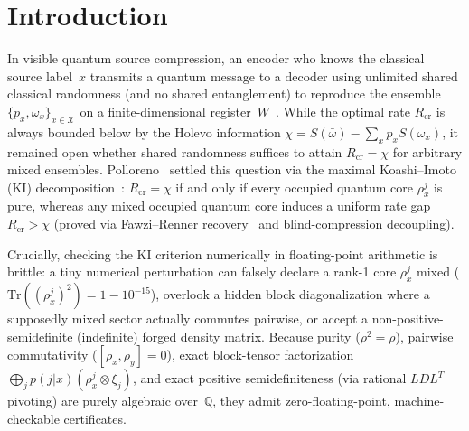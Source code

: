 \documentclass[11pt,twocolumn]{article}
\newcommand{\QQ}{\mathbb{Q}}
\newcommand{\Tr}{\mathrm{Tr}}
\begin{document}
\section{Introduction}
In visible quantum source compression, an encoder who knows the classical source label~$x$ transmits a quantum message to a decoder using unlimited shared classical randomness (and no shared entanglement) to reproduce the ensemble $\{p_x, \omega_x\}_{x \in \mathcal{X}}$ on a finite-dimensional register~$W$~\cite{schumacher1995quantum}. While the optimal rate $R_{\mathrm{cr}}$ is always bounded below by the Holevo information $\chi = S(\bar{\omega}) - \sum_x p_x S(\omega_x)$, it remained open whether shared randomness suffices to attain $R_{\mathrm{cr}} = \chi$ for arbitrary mixed ensembles. Polloreno~\cite{polloreno2026koashi} settled this question via the maximal Koashi--Imoto (KI) decomposition~\cite{koashi2002operations,hayden2004structure}: $R_{\mathrm{cr}} = \chi$ if and only if every occupied quantum core $\rho_x^j$ is pure, whereas any mixed occupied quantum core induces a uniform rate gap $R_{\mathrm{cr}} > \chi$ (proved via Fawzi--Renner recovery~\cite{fawzi2015quantum} and blind-compression decoupling).

Crucially, checking the KI criterion numerically in floating-point arithmetic is brittle: a tiny numerical perturbation can falsely declare a rank-1 core $\rho_x^j$ mixed ($\Tr((\rho_x^j)^2) = 1 - 10^{-15}$), overlook a hidden block diagonalization where a supposedly mixed sector actually commutes pairwise, or accept a non-positive-semidefinite (indefinite) forged density matrix. Because purity ($\rho^2 = \rho$), pairwise commutativity ($[\rho_x, \rho_y] = 0$), exact block-tensor factorization $\bigoplus_j p(j|x)(\rho_x^j \otimes \xi_j)$, and exact positive semidefiniteness (via rational $LDL^T$ pivoting) are purely algebraic over~$\QQ$, they admit zero-floating-point, machine-checkable certificates.
\end{document}
